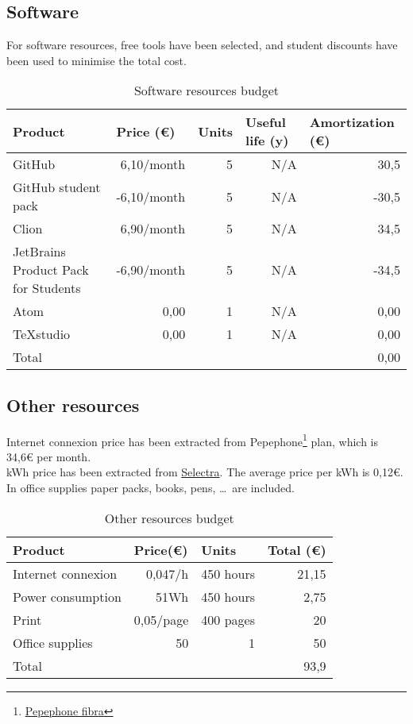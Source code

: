 \subsection{Software}
For software resources, free tools have been selected, and student discounts have been used to minimise the total cost.
\begin{table}[h!]
	\centering
	\begin{tabular}{|l|r|r|r|r|}
		\hline
		Product              & \multicolumn{1}{l|}{Price (€)} & \multicolumn{1}{l|}{Units} & \multicolumn{1}{l|}{Useful life (y)} & \multicolumn{1}{l|}{Amortization (€)} \\ \hline
		GitHub	& 6,10/month & 5 & N/A & 30,5 \\ \hline
		GitHub student pack & -6,10/month & 5 & N/A & -30,5 \\ \hline
		Clion 	& 6,90/month & 5 & N/A & 34,5 \\ \hline
		JetBrains Product Pack for Students & -6,90/month & 5 & N/A & -34,5 \\ \hline
		Atom 	& 0,00 & 1 & N/A & 0,00 \\ \hline
		TeXstudio 	& 0,00 & 1 & N/A & 0,00 \\ \hline\hline
		Total	& \multicolumn{4}{r|}{0,00}                                                                                           \\ \hline
	\end{tabular}
	\caption{Software resources budget}
	\label{SoftwareResources}
\end{table}

\subsection{Other resources}
Internet connexion price has been extracted from Pepephone\footnote{\href{https://www.pepephone.com/internet-en-casa}{Pepephone fibra}} plan, which is 34,6€ per month. \\
kWh price has been extracted from \href{https://tarifasgasluz.com/faq/precio-kwh-espana-2017}{Selectra}. The average price per kWh is 0,12€.
In office supplies paper packs, books, pens, \ldots \ are included.
\begin{table}[h!]
	\centering
	\begin{tabular}{|l|r|r|r|}
		\hline
		\multicolumn{1}{|l|}{Product} & \multicolumn{1}{l|}{Price(€)} & \multicolumn{1}{l|}{Units} & \multicolumn{1}{l|}{Total (€)} \\ \hline
		Internet connexion & 0,047/h & 450 hours & 21,15\\ \hline
		Power consumption & 51Wh & 450 hours & 2,75 \\ \hline
		Print & 0,05/page & 400 pages & 20 \\ \hline
		Office supplies & 50 & 1 & 50 \\ \hline\hline
		Total & \multicolumn{3}{r|}{93,9}                                                                        \\ \hline
	\end{tabular}
	\caption{Other resources budget}
	\label{OtherResources}
\end{table}

